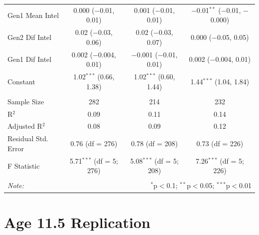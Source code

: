 \documentclass[a4paper,man,apacite,natbib,12pt,longtable]{apa6}\usepackage[]{graphicx}\usepackage[]{color}
\begin{document}
\begin{landscape}
\begin{longtable}{@{\extracolsep{5pt}}lccc}
  Gen1 Mean Intel & 0.000 ($-$0.01, 0.01) & 0.001 ($-$0.01, 0.01) & $-$0.01$^{**}$ ($-$0.01, $-$0.000) \\ 
  Gen2 Dif Intel & 0.02 ($-$0.03, 0.06) & 0.02 ($-$0.03, 0.07) & 0.000 ($-$0.05, 0.05) \\ 
  Gen1 Dif Intel & 0.002 ($-$0.004, 0.01) & $-$0.001 ($-$0.01, 0.01) & 0.002 ($-$0.004, 0.01) \\ 
  Constant & 1.02$^{***}$ (0.66, 1.38) & 1.02$^{***}$ (0.60, 1.44) & 1.44$^{***}$ (1.04, 1.84) \\ 
 \hline \\[-1.8ex] 
Sample Size & 282 & 214 & 232 \\ 
R$^{2}$ & 0.09 & 0.11 & 0.14 \\ 
Adjusted R$^{2}$ & 0.08 & 0.09 & 0.12 \\ 
Residual Std. Error & 0.76 (df = 276) & 0.78 (df = 208) & 0.73 (df = 226) \\ 
F Statistic & 5.71$^{***}$ (df = 5; 276) & 5.08$^{***}$ (df = 5; 208) & 7.26$^{***}$ (df = 5; 226) \\ 
\hline 
\hline \\[-1.8ex] 
\textit{Note:}  & \multicolumn{3}{r}{$^{*}$p$<$0.1; $^{**}$p$<$0.05; $^{***}$p$<$0.01} \\ 
  \end{longtable}
  \section{Age 11.5 Replication}\label{appen11}

\end{landscape}
\end{document}
